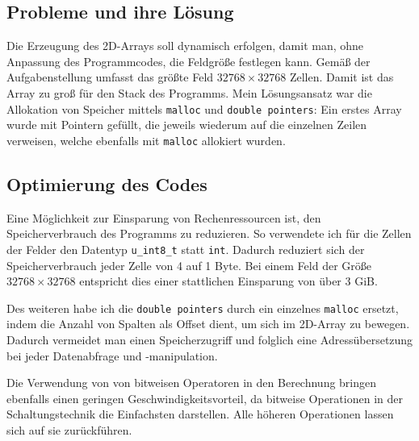 \documentclass[german,plainarticle,hyperref,utf8]{zihpub}
\begin{document}
	\subsection{Probleme und ihre Lösung}
	Die Erzeugung des 2D-Arrays soll dynamisch erfolgen, damit man, ohne Anpassung des Programmcodes, die Feldgröße festlegen kann. Gemäß der Aufgabenstellung umfasst das größte Feld $32768\times 32768$ Zellen. Damit ist das Array zu groß für den Stack des Programms.
	Mein Lösungsansatz war die Allokation von Speicher mittels \verb|malloc| und \verb|double pointers|: Ein erstes Array wurde mit Pointern gefüllt, die jeweils wiederum auf die einzelnen Zeilen verweisen, welche ebenfalls mit \verb|malloc| allokiert wurden.
	
	\subsection{Optimierung des Codes}
	Eine Möglichkeit zur Einsparung von Rechenressourcen ist, den Speicherverbrauch des Programms zu reduzieren. So verwendete ich für die Zellen der Felder den Datentyp \verb|u_int8_t| statt \verb|int|. Dadurch reduziert sich der Speicherverbrauch jeder Zelle von 4 auf 1 Byte. Bei einem Feld der Größe $32768\times 32768$ entspricht dies einer stattlichen Einsparung von über 3 GiB.
		
	Des weiteren habe ich die \verb|double pointers| durch ein einzelnes \verb|malloc| ersetzt, indem die Anzahl von Spalten als Offset dient, um sich im 2D-Array zu bewegen. Dadurch vermeidet man einen Speicherzugriff und folglich eine Adressübersetzung bei jeder Datenabfrage und -manipulation.
	
	Die Verwendung von von bitweisen Operatoren in den Berechnung bringen ebenfalls einen geringen Geschwindigkeitsvorteil, da bitweise Operationen in der Schaltungstechnik die Einfachsten darstellen. Alle höheren Operationen lassen sich auf sie zurückführen.
\end{document}
